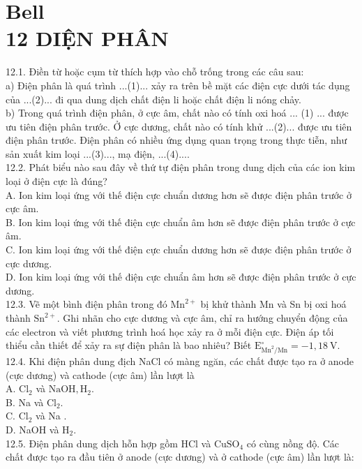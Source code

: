 \documentclass[10pt]{article}
\begin{document}
\section*{Bell \\
 12 DIỆN PHÂN}
12.1. Điền từ hoặc cụm từ thích hợp vào chỗ trống trong các câu sau:\\
a) Điện phân là quá trình ...(1)... xảy ra trên bề mặt các điện cực dưới tác dụng của ...(2)... đi qua dung dịch chất điện li hoặc chất điện li nóng chảy.\\
b) Trong quá trình điện phân, ở cực âm, chất nào có tính oxi hoá ... (1) ... được ưu tiên điện phân trước. Ở cực dương, chất nào có tính khử ...(2)... được ưu tiên điện phân trước. Điện phân có nhiều ứng dụng quan trọng trong thực tiễn, như sản xuất kim loại ...(3)..., mạ điện, ...(4)....\\
12.2. Phát biểu nào sau đây về thứ tự điện phân trong dung dịch của các ion kim loại ở điện cực là đúng?\\
A. Ion kim loại ứng với thế điện cực chuẩn dương hơn sẽ được điện phân trước ở cực âm.\\
B. Ion kim loại ứng với thế điện cực chuẩn âm hơn sẽ được điện phân trước ở cực âm.\\
C. Ion kim loại ứng với thế điện cực chuẩn dương hơn sẽ được điện phân trước ở cực dương.\\
D. Ion kim loại ứng với thế điện cực chuẩn âm hơn sẽ được điện phân trước ở cực dương.\\
12.3. Vẽ một bình điện phân trong đó $\mathrm{Mn}^{2+}$ bị khử thành Mn và Sn bị oxi hoá thành $\mathrm{Sn}^{2+}$. Ghi nhãn cho cực dương và cực âm, chỉ ra hướng chuyển động của các electron và viết phương trình hoá học xảy ra ở mỗi điện cực. Điện áp tối thiểu cần thiết để xảy ra sự điện phân là bao nhiêu? Biết $\mathrm{E}_{\mathrm{Mn}^{2} / \mathrm{Mn}}^{\circ}=-1,18 \mathrm{~V}$.\\
12.4. Khi điện phân dung địch NaCl có màng ngăn, các chất được tạo ra ở anode (cực dương) và cathode (cực âm) lần lượt là\\
A. $\mathrm{Cl}_{2}$ và $\mathrm{NaOH}, \mathrm{H}_{2}$.\\
B. Na và $\mathrm{Cl}_{2}$.\\
C. $\mathrm{Cl}_{2}$ và Na .\\
D. NaOH và $\mathrm{H}_{2}$.\\
12.5. Điện phân dung dịch hỗn hợp gồm HCl và $\mathrm{CuSO}_{4}$ có cùng nồng độ. Các chất được tạo ra đầu tiên ở anode (cực dương) và ở cathode (cực âm) lần lượt là:\\
\end{document}
